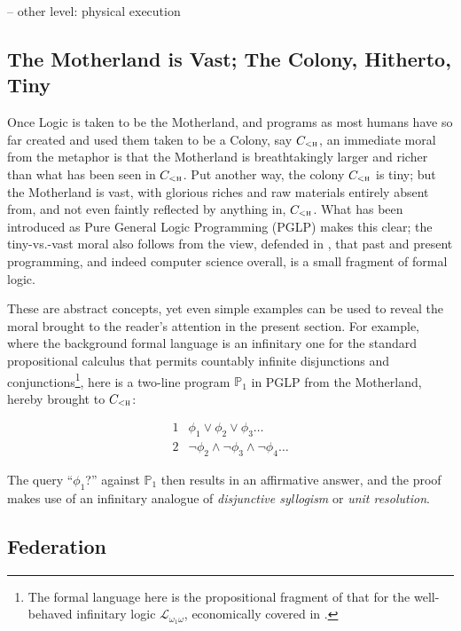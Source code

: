 \documentclass[]{article}
\begin{document}
-- other level: physical execution


\subsection{The Motherland is Vast; The Colony, Hitherto, Tiny}
\label{sect:motherlandvast_colonytiny}

\noindent
%
Once Logic is taken to be the Motherland, and programs as most humans
have so far created and used them taken to be a Colony, say
$C_\textsc{<h}$, an immediate moral from the metaphor is that the
Motherland is breathtakingly larger and richer than what has been seen
in $C_\textsc{<h}$.  Put another way, the colony $C_\textsc{<h}$ is
tiny; but the Motherland is vast, with glorious riches and raw
materials entirely absent from, and not even faintly reflected by
anything in, $C_\textsc{<h}$.  What has been introduced as Pure
General Logic Programming (PGLP) \cite{introduction_of_PGLP} makes
this clear; the tiny-vs.-vast moral also follows from the view,
defended in \cite{comp_sci_immaterial_formal_logic}, that past and
present programming, and indeed computer science overall, is a small
fragment of formal logic.

These are abstract concepts, yet even simple examples can be used to
reveal the moral brought to the reader's attention in the present
section.  For example, where the background formal language is an
infinitary one for the standard propositional calculus that permits
countably infinite disjunctions and conjunctions\footnote{The formal
	language here is the propositional fragment of that for the
	well-behaved infinitary logic $\mathscr{L}_{\omega_1 \omega}$,
	economically covered in \cite{ebb.flum.thomas.2nded}.}, here is a
two-line program $\mathbb{P}_1$ in PGLP from the Motherland, hereby
brought to $C_\textsc{<h}$:

\medskip
$$
\begin{array}{l|l}
1 &  \phi_1 \vee \phi_2 \vee \phi_3 \ldots\\
2 & \neg \phi_2 \wedge \neg \phi_3 \wedge \neg \phi_4 \ldots
\end{array}
$$
\medskip

\noindent
%
The query ``$\phi_1$?'' against $\mathbb{P}_1$ then results in an
affirmative answer, and the proof makes use of an infinitary analogue
of \textit{disjunctive syllogism} or \textit{unit resolution}.


\subsection{Federation}
\end{document}
